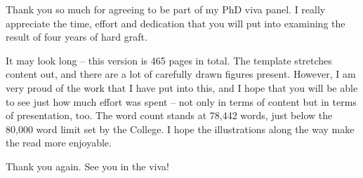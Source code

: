 
\begin{preamble}
{}

Thank you so much for agreeing to be part of my PhD viva panel. I really appreciate the time, effort and dedication that you will put into examining the result of four years of hard graft.

It may look long -- this version is 465 pages in total. The template stretches content out, and there are a lot of carefully drawn figures present. However, I am very proud of the work that I have put into this, and I hope that you will be able to see just how much effort was spent -- not only in terms of content but in terms of presentation, too. The word count stands at 78,442 words, just below the 80,000 word limit set by the College. I hope the illustrations along the way make the read more enjoyable.

Thank you again. See you in the viva!
\end{preamble}